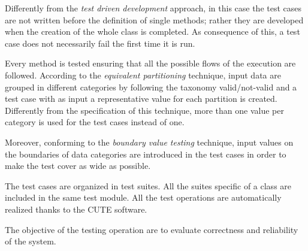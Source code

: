 	Differently from the \emph{test driven development} approach, in this case the test cases are not written before the definition of single methods; rather they are developed when the creation of the whole class is completed.
	As consequence of this, a test case does not necessarily fail the first time it is run. 
	
	Every method is tested ensuring that all the possible flows of the execution are followed.
	According to the \emph{equivalent partitioning} technique, input data are grouped in different categories by following the taxonomy valid/not-valid and a test case with as input a representative value for each partition is created. 
	Differently from the specification of this technique, more than one value per category is used for the test cases instead of one.

	Moreover, conforming to the \emph{boundary value testing} technique, input values on the boundaries of data categories are introduced in the test cases in order to make the test cover as wide as possible. 

	The test cases are organized in test suites. All the suites specific of a class are included in the same test module. 
	All the test operations are automatically realized thanks to the CUTE software.

	The objective of the testing operation are to evaluate correctness and reliability of the system.




